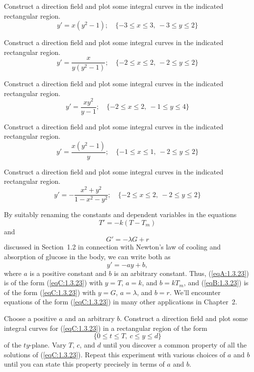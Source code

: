 \documentclass{ximera}
\begin{document}
\begin{problem}\label{exer:1.3.18} Construct a direction field and plot some integral curves in the indicated rectangular region.
$$y'=x(y^2-1);    \quad  \{-3\leq x\leq 3,\ -3\leq y\leq 2\}$$
\end{problem}

\begin{problem}\label{exer:1.3.19} Construct a direction field and plot some integral curves in the indicated rectangular region.
$$y'=\frac{x}{y(y^2-1)};    \quad  \{-2\leq x\leq 2,\ -2\leq y\leq 2\}$$
\end{problem}

\begin{problem}\label{exer:1.3.20} Construct a direction field and plot some integral curves in the indicated rectangular region.
$$y'=\frac{xy^2}{y-1};    \quad  \{-2\leq x\leq 2,\ -1\leq y\leq 4\}$$
\end{problem}

\begin{problem}\label{exer:1.3.21} Construct a direction field and plot some integral curves in the indicated rectangular region.
$$y'=\frac{x(y^2-1)}{y};    \quad  \{-1\leq x\leq 1,\ -2\leq y\leq 2\}$$
\end{problem}

\begin{problem}\label{exer:1.3.22} Construct a direction field and plot some integral curves in the indicated rectangular region.
$$y'=-\frac{x^2+y^2}{1-x^2-y^2};    \quad  \{-2\leq x\leq 2,\ -2\leq y\leq 2\}$$
\end{problem}

\begin{problem}\label{exer:1.3.23}
By suitably renaming the constants and  dependent variables
in the equations
\begin{equation}\label{eqA:1.3.23}
T' = -k(T-T_m)
\end{equation}
and
\begin{equation}\label{eqB:1.3.23}
G'=-\lambda G+r
\end{equation}
discussed in Section~1.2 in connection with Newton's
law of cooling and absorption of glucose in the body, we can
write both as
\begin{equation}\label{eqC:1.3.23}
y'=- ay+b,
\end{equation}
where $a$ is a positive constant and $b$ is an arbitrary
constant. Thus, (\ref{eqA:1.3.23}) is of the form (\ref{eqC:1.3.23}) with $y=T$, $a=k$, and
$b=kT_m$, and (\ref{eqB:1.3.23}) is of the form (\ref{eqC:1.3.23}) with $y=G$,
$a=\lambda$, and $b=r$. We'll encounter equations of the form
(\ref{eqC:1.3.23}) in many other applications in Chapter~2.

Choose a positive  $a$  and an
arbitrary  $b$.
 Construct a  direction field and plot some integral curves for (\ref{eqC:1.3.23}) in a rectangular region of the form
$$
\{0\leq t\leq T,\ c\leq y\leq d\}
$$
 of the $ty$-plane.
 Vary $T$, $c$, and $d$ until you discover a common property
of all the solutions of (\ref{eqC:1.3.23}). Repeat this experiment with various
choices of $a$ and $b$ until you can state
this property precisely in terms of $a$ and $b$.
\end{problem}
\end{document}
